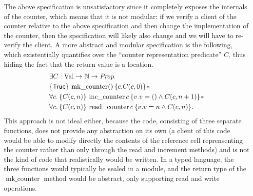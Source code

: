 The above specification is unsatisfactory since it completely exposes
the internals of the counter, which means that it is not modular: if
we verify a client of the counter relative to the above specification
and then change the implementation of the counter, then the
specification will likely also change and we will have to re-verify
the client.  A more abstract and modular specification is the
following, which existentially quantifies over the ``counter
representation predicate'' $C$, thus hiding the fact that the return
value is a location.
\begin{align}
  \label{eq:counter-example:specification-style-we-use}
  \begin{split}
    &\Exists C : \Val \to \NN \to \Prop.\\
    &\hoare{\TRUE}{\operatorname{mk\_counter} \TT}{c. C(c, 0)} \ast \\
    &\All c . \hoare{C(c, n)}{\operatorname{inc\_counter} c}{v. v = \TT \land C(c, n + 1)} \ast\\
    &\All c . \hoare{C(c, n)}{\operatorname{read\_counter} c}{v. v = n \land C(c, n)}.
  \end{split}
\end{align}
This approach is not ideal either, because the code, consisting of
three separate functions, does not provide any abstraction on its own
(a client of this code would be able to modify directly the contents of the
reference cell reprensenting the 
counter rather than only through the read and increment methods)
and is not the kind of code that realistically would be written.  In a
typed language, the three functions would typically be sealed in a module,
and the return type of the $\operatorname{mk\_counter}$
method would be abstract, only supporting read and write operations.

